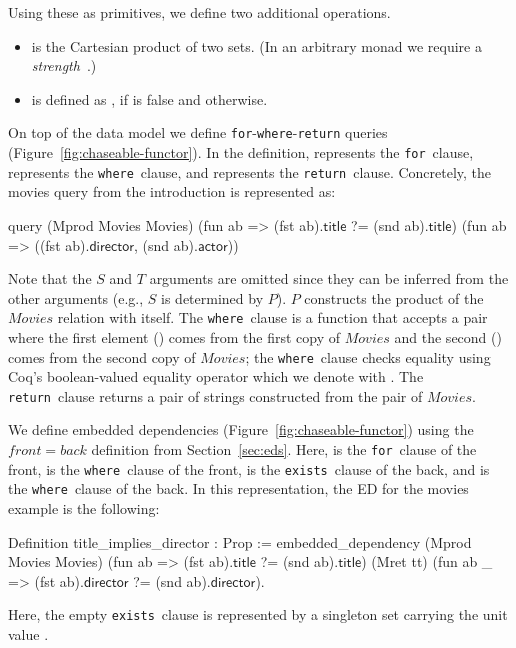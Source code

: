 \documentclass{sigplanconf}
\newcommand{\FOR}{{\tt for}\relax\ifmmode\ \else\xspace\fi}
\newcommand{\EXISTS}{{\tt exists}\relax\ifmmode\ \else\xspace\fi}
\newcommand{\WHERE}{{\tt where}\relax\ifmmode\ \else\xspace\fi}
\newcommand{\RETURN}{{\tt return}\relax\ifmmode\ \else\xspace\fi}
\newcommand{\relation}[1]{\ensuremath{\mathit{#1}}\xspace}
\begin{document}
Using these as primitives, we define two additional operations.
\begin{itemize}
\item {} is the Cartesian product of two sets.  (In an arbitrary monad we require a {\it strength}~\cite{BW}.)
\item {} is defined as , if  is false and  otherwise.
\end{itemize}
On top of the data model we define {\tt for}-{\tt where}-{\tt return} queries (Figure~\ref{fig:chaseable-functor}).
In the definition,  represents the \FOR clause,  represents the \WHERE clause, and  represents the \RETURN clause.
Concretely, the movies query from the introduction is represented as:
\begin{coq}
query (Mprod Movies Movies)
      (fun ab => (fst ab).$\textsf{title}$ ?= (snd ab).$\textsf{title}$)
      (fun ab => ((fst ab).$\textsf{director}$, (snd ab).$\textsf{actor}$))
\end{coq}
Note that the $S$ and $T$ arguments are omitted since they can be inferred from the other arguments (e.g., $S$ is determined by $P$).  $P$ constructs the product of the \relation{Movies} relation with itself.
The \WHERE clause is a function that accepts a pair where the first element () comes from the first copy of \relation{Movies} and the second () comes from the second copy of \relation{Movies}; the \WHERE clause checks equality using Coq's boolean-valued equality operator which we denote with .  The \RETURN clause returns a pair of strings constructed from the pair of \relation{Movies}.


We define embedded dependencies (Figure~\ref{fig:chaseable-functor}) using the $front = back$ definition from Section~\ref{sec:eds}.
Here,  is the \FOR clause of the front,  is the \WHERE clause of the front,  is the \EXISTS clause of the back, and  is the \WHERE clause of the back.
In this representation, the ED for the movies example is the following:
\begin{coq}
Definition title_implies_director : Prop :=
  embedded_dependency
    (Mprod Movies Movies)
    (fun ab => (fst ab).$\textsf{title}$ ?= (snd ab).$\textsf{title}$)
    (Mret tt)
    (fun ab _ => (fst ab).$\textsf{director}$ ?= (snd ab).$\textsf{director}$).
\end{coq}
Here, the empty \EXISTS clause is represented by a singleton set carrying the unit value .
\end{document}
